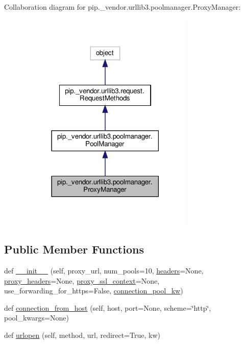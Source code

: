 Collaboration diagram for pip.\+\_\+vendor.\+urllib3.\+poolmanager.\+Proxy\+Manager\+:
\nopagebreak
\begin{figure}[H]
\begin{center}
\leavevmode
\includegraphics[width=237pt]{classpip_1_1__vendor_1_1urllib3_1_1poolmanager_1_1ProxyManager__coll__graph}
\end{center}
\end{figure}
\subsection*{Public Member Functions}
\begin{DoxyCompactItemize}
\item 
def \hyperlink{classpip_1_1__vendor_1_1urllib3_1_1poolmanager_1_1ProxyManager_ac29d5832324b43be87f3bb14e73bd360}{\+\_\+\+\_\+init\+\_\+\+\_\+} (self, proxy\+\_\+url, num\+\_\+pools=10, \hyperlink{classpip_1_1__vendor_1_1urllib3_1_1request_1_1RequestMethods_a507ade459b427bd81a5a8849563702e3}{headers}=None, \hyperlink{classpip_1_1__vendor_1_1urllib3_1_1poolmanager_1_1ProxyManager_ae2670de8938cd39588e6e17189177cd7}{proxy\+\_\+headers}=None, \hyperlink{classpip_1_1__vendor_1_1urllib3_1_1poolmanager_1_1ProxyManager_aa22b381efad94c37841182b63c06b2d3}{proxy\+\_\+ssl\+\_\+context}=None, use\+\_\+forwarding\+\_\+for\+\_\+https=False, \hyperlink{classpip_1_1__vendor_1_1urllib3_1_1poolmanager_1_1PoolManager_a509374901e1f086853c6df9928b7312a}{connection\+\_\+pool\+\_\+kw})
\item 
def \hyperlink{classpip_1_1__vendor_1_1urllib3_1_1poolmanager_1_1ProxyManager_a5600fa9fa9caa11c0abf43ba4950d46b}{connection\+\_\+from\+\_\+host} (self, host, port=None, scheme=\char`\"{}http\char`\"{}, pool\+\_\+kwargs=None)
\item 
def \hyperlink{classpip_1_1__vendor_1_1urllib3_1_1poolmanager_1_1ProxyManager_a96151d6fe736d4fdf893837f446995ff}{urlopen} (self, method, url, redirect=True, kw)
\end{DoxyCompactItemize}

